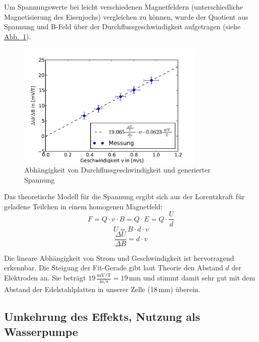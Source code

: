 \documentclass[11pt]{scrartcl}
\newcommand{\unit}[1]{\ensuremath{\,\mathrm{#1}}} %
\newcommand{\abb}[1]{\hyperref[#1]{Abb.~\ref{#1}}}
\begin{document}
Um Spannungswerte bei leicht verschiedenen Magnetfeldern (unterschiedliche Magnetisierung des Eisenjochs) vergleichen zu können, wurde der Quotient aus Spannung und B-Feld über der Durchflussgeschwindigkeit aufgetragen (siehe \abb{v-U}).

\begin{figure}[ht]
\begin{center}
\includegraphics[width=0.8\textwidth]{images/v-U.pdf}
\end{center}
\vspace{-1.5\baselineskip}
\caption{Abhängigkeit von Durchflussgeschwindigkeit und generierter Spannung}
\label{v-U}
\end{figure}

Das theoretische Modell für die Spannung ergibt sich aus der Lorentzkraft für geladene Teilchen in einem homogenen Magnetfeld:
\begin{equation}
F=Q\cdot v\cdot B = Q \cdot E = Q \cdot \frac{U}{d}
\end{equation}
\begin{equation}
U=B \cdot d \cdot v
\end{equation}
\begin{equation}
\frac{\Delta U}{\Delta B}=d \cdot v
\end{equation}

Die lineare Abhängigkeit von Strom und Geschwindigkeit ist hervorragend erkennbar. Die Steigung der Fit-Gerade gibt laut Theorie den Abstand $d$ der Elektroden an. Sie beträgt $19 \unit{\frac{ mV/T }{ m/s }} = 19 \unit{mm}$ und stimmt damit sehr gut mit dem Abstand der Edelstahlplatten in unserer Zelle (18\unit{mm}) überein.


\subsection{Umkehrung des Effekts, Nutzung als Wasserpumpe}		%
\end{document}

